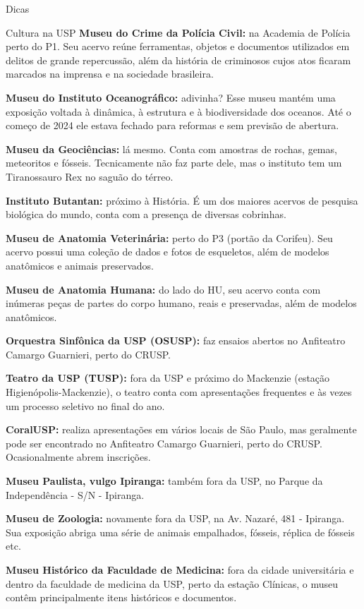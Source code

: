 \begin{secao}{Dicas}
\begin{subsecao}{Cultura na USP}
{\bf Museu do Crime da Polícia Civil:} na Academia de Polícia perto do P1. Seu acervo
reúne ferramentas, objetos e documentos utilizados em delitos de grande repercussão, 
além da história de criminosos cujos atos ficaram marcados na imprensa e na sociedade
brasileira.

{\bf Museu do Instituto Oceanográfico:} adivinha? Esse museu mantém uma exposição
voltada à dinâmica, à estrutura e à biodiversidade dos oceanos. Até o começo de
2024 ele estava fechado para reformas e sem previsão de abertura.

{\bf Museu da Geociências:} lá mesmo. Conta com amostras de rochas, gemas, meteoritos 
e fósseis. Tecnicamente não faz parte dele, mas o instituto tem um Tiranossauro Rex no
saguão do térreo.

{\bf Instituto Butantan:} próximo à História. É um dos maiores acervos de pesquisa
biológica do mundo, conta com a presença de diversas cobrinhas. 

{\bf Museu de Anatomia Veterinária:} perto do P3 (portão da Corifeu). Seu acervo
possui uma coleção de dados e fotos de esqueletos, além de modelos anatômicos e
animais preservados.

{\bf Museu de Anatomia Humana:} do lado do HU, seu acervo conta com inúmeras peças
de partes do corpo humano, reais e preservadas, além de modelos anatômicos.

{\bf Orquestra Sinfônica da USP (OSUSP):} faz ensaios abertos no Anfiteatro
Camargo Guarnieri, perto do CRUSP.

{\bf Teatro da USP (TUSP):} fora da USP e próximo do Mackenzie (estação
Higienópolis-Mackenzie), o teatro conta com apresentações frequentes e às vezes
um processo seletivo no final do ano.

{\bf CoralUSP:} realiza apresentações em vários locais de São Paulo, mas geralmente
pode ser encontrado no Anfiteatro Camargo Guarnieri, perto do CRUSP. Ocasionalmente
abrem inscrições.

{\bf Museu Paulista, vulgo Ipiranga:} também fora da USP, no Parque da
Independência - S/N - Ipiranga.

{\bf Museu de Zoologia:} novamente fora da USP, na Av. Nazaré, 481 -
Ipiranga. Sua exposição abriga uma série de animais empalhados, fósseis,
réplica de fósseis etc.

{\bf Museu Histórico da Faculdade de Medicina:} fora da cidade universitária e
dentro da faculdade de medicina da USP, perto da estação Clínicas, o museu contêm
principalmente itens históricos e documentos.


\end{subsecao}
\end{secao}
